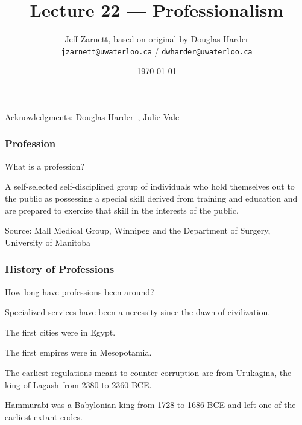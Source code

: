 

\title{Lecture 22 --- Professionalism }

\author{Jeff Zarnett, based on original by Douglas Harder \\ \small \texttt{jzarnett@uwaterloo.ca} / \texttt{dwharder@uwaterloo.ca}}
\date{\today}




\begin{frame}
  \titlepage

\begin{center}
  \small{Acknowledgments: Douglas Harder~\cite{dwh}, Julie Vale~\cite{jv}}
  \end{center}
\end{frame}




\begin{frame}
\frametitle{Profession}

What is a profession?

	A self-selected self-disciplined group of individuals who hold themselves out to the public as possessing a special skill derived from training and education and are prepared to exercise that skill in the interests of the public.

{\scriptsize Source: Mall Medical Group, Winnipeg and the Department of Surgery, University of Manitoba}

\end{frame}




\begin{frame}
\frametitle{History of Professions}

How long have professions been around?

Specialized services have been a necessity since the dawn of civilization.

The first cities were in Egypt.

The first empires were in Mesopotamia.

The earliest regulations meant to counter corruption are from Urukagina, the king of Lagash from 2380 to 2360 BCE.

Hammurabi was a Babylonian king from 1728 to 1686 BCE and left one of the earliest extant codes.

\end{frame}



